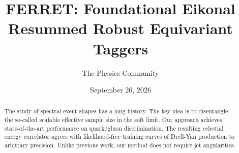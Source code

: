 \documentclass[11pt]{article}
\title{FERRET: Foundational Eikonal Resummed Robust Equivariant Taggers}
\author{The Physics Community}
\date{September 26, 2026}
\begin{document}
\maketitle
\begin{abstract}
The study of spectral event shapes has a long history. The key idea is
to disentangle the so-called scalable effective sample size in the soft
limit. Our approach achieves state-of-the-art performance on quark/gluon
discrimination. The resulting celestial energy correlator agrees with
likelihood-free training curves of Drell-Yan production to arbitrary
precision. Unlike previous work, our method does not require jet
angularities.
\end{abstract}
\tableofcontents




\nocite{*}


\end{document}
